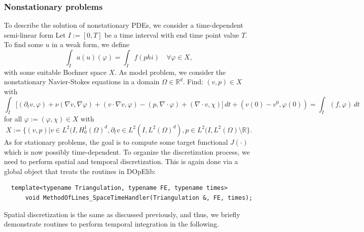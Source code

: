 \documentclass[prodmode,acmtoms]{acmsmall}
\numberwithin{equation}{section}
\renewcommand{\phi}{\varphi}
\begin{document}
\subsubsection{Nonstationary problems}\label{sec:timedep}
To describe the solution of nonstationary 
PDEs, we consider a time-dependent semi-linear form
Let $I:=[0,T]$ be a time interval with end time point value $T$.
To find some $u$ in a weak form, we define
\[
\int_I a(u)(\phi) = \int_I f(phi) \quad \forall\phi\in X,
\]
with some suitable Bochner space $X$.  As model problem,
we consider the nonstationary Navier-Stokes equations
in a domain $\Omega\in\mathbb{R}^d$. Find: 
$(v,p)\in X$ with
\[
\int_I \bigl[ (\partial_t v, \phi)
+ \nu (\nabla v, \nabla \phi) + (v\cdot\nabla v, \phi)
- (p,\nabla\cdot \phi)
+ (\nabla\cdot v, \chi)\bigr] \, dt
+ (v(0) - v^0, \phi(0))
= \int_I (f,\phi) \, dt 
\]
for all $\phi:= (\phi, \chi) \in X$ with
\[
X:= \bigl\{ 
(v,p) | v\in L^2(I,H_0^1(\Omega)^d , 
\partial_t v\in L^2(I, L^2(\Omega)^d), 
p\in L^2(I,L^2(\Omega)\setminus\mathbb{R} \bigr\}.
\]
As for stationary problems, the goal is to compute
some target functional $J(\cdot)$ which is now possibly 
time-dependent. To organize the discretization 
process, we need to perform spatial and temporal 
discretization. This is again done via
a global object that treats the routines
in DOpElib:
\begin{lstlisting}
  template<typename Triangulation, typename FE, typename times>
      void MethodOfLines_SpaceTimeHandler(Triangulation &, FE, times);
\end{lstlisting}
Spatial discretization is the same
as discussed previously, and thus, we briefly demonstrate
routines to perform temporal integration in the following. 
\end{document}

